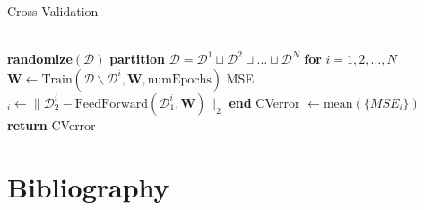 \documentclass[prl,amsmath,amssymb,floatfix,superscriptaddress,notitlepage,twocolumn]{revtex4}
\begin{document}
\begin{algorithm}[H]
\caption{Cross Validation}\label{cross_val}
\begin{algorithmic}[]
\\

\State \textbf{randomize}$(\mathcal{D})$
\State \textbf{partition} $\mathcal{D}=\mathcal{D}^1\sqcup\mathcal{D}^2\sqcup\dots\sqcup\mathcal{D}^N$
\State \textbf{for } $i=1,2,\dots,N$
\State \hspace{.25cm} $\textbf{W}\gets \text{Train}(\mathcal{D\backslash \mathcal{D}}^i, \textbf{W}, \text{numEpochs})$
\State \hspace{.25cm} MSE$_i\gets\|\mathcal{D}^i_2-\text{FeedForward}(\mathcal{D}^i_1,\textbf{W})\|_2$
\State \textbf{end}
\State CVerror $\gets \text{mean}(\{MSE_i\})$\\
\State \textbf{return} CVerror\\

\EndProcedure
\end{algorithmic}
\end{algorithm}

\section{Bibliography}


\end{document}
